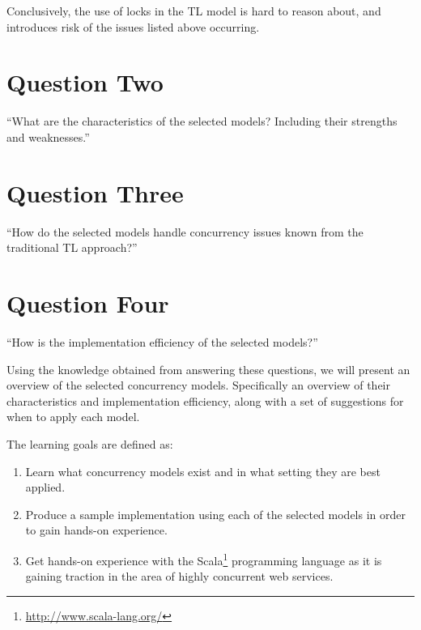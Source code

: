 Conclusively, the use of locks in the \ac{TL} model is hard to reason about, and introduces risk of the issues listed above occurring. 

\section{Question Two}
``What are the characteristics of the selected models? Including their strengths and weaknesses.''
\section{Question Three}
``How do the selected models handle concurrency issues known from the traditional \ac{TL} approach?''
\section{Question Four}
``How is the implementation efficiency of the selected models?''


Using the knowledge obtained from answering these questions, we will present an overview of the selected concurrency models. Specifically an overview of their characteristics and implementation efficiency, along with a set of suggestions for when to apply each model.




The learning goals are defined as:
\begin{enumerate}
\item Learn what concurrency models exist and in what setting they are best applied.
\item Produce a sample implementation using each of the selected models in order to gain hands-on experience.
\item Get hands-on experience with the Scala\footnote{\url{http://www.scala-lang.org/}} programming language as it is gaining traction in the area of highly concurrent web services.
\end{enumerate}
\worksheetend